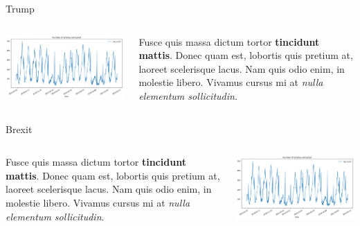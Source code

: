 \documentclass[final]{beamer}
\newlength{\twocolwid}
\begin{document}
\begin{frame}[t]
\begin{columns}[t]
\begin{column}{\twocolwid}
\begin{block}{Trump}
\begin{columns}[onlytextwidth]
    \begin{column}{.45\textwidth}
        \includegraphics[width=0.8\linewidth]{log_extraction.png} 
    \end{column}
    \begin{column}{.55\textwidth}
        Fusce quis massa dictum tortor \textbf{tincidunt mattis}. Donec quam est, lobortis quis pretium at, laoreet scelerisque lacus. Nam quis odio enim, in molestie libero. Vivamus cursus mi at \textit{nulla elementum sollicitudin}.
    \end{column}
\end{columns}

\end{block}


\begin{block}{Brexit {}}


    \begin{columns}[onlytextwidth]
        \begin{column}{.55\textwidth}
            Fusce quis massa dictum tortor \textbf{tincidunt mattis}. Donec quam est, lobortis quis pretium at, laoreet scelerisque lacus. Nam quis odio enim, in molestie libero. Vivamus cursus mi at \textit{nulla elementum sollicitudin}.
        \end{column}
        \begin{column}{.45\textwidth}
            \includegraphics[width=0.8\linewidth]{log_extraction.png} 
        \end{column}
    \end{columns}


\end{block}
\end{column}
\end{columns}
\end{frame}
\end{document}
